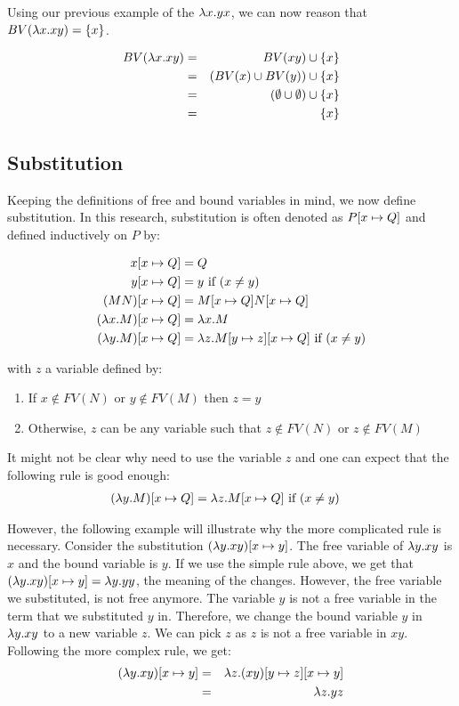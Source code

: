 Using our previous example of the \lterm $\lambda {x}.{yx}$, we can now reason that $BV(\lambda {x}.{xy}) = \{x\}$. 

\begin{eqnarray*}
	BV(\lambda {x}.{xy}) &=& BV(xy) \cup \{x\} \\
	&=& (BV(x) \cup BV(y)) \cup \{x\} \\
	&=& (\emptyset \cup \emptyset) \cup \{x\} \\
	&=& \{x\}
\end{eqnarray*}

\subsection{Substitution}
Keeping the definitions of free and bound variables in mind, we now define substitution. 
In this research, substitution is often denoted as $P [{x}\mapsto{Q}]$ and defined inductively on $P$ by:

\begin{align*}
	x [{x}\mapsto{Q}]             &= Q \\
	y [{x}\mapsto{Q}]             &= y \text{ if } (x \neq y)\\
	(M N) [{x}\mapsto{Q}]         &= M [{x}\mapsto{Q}] N [{x}\mapsto{Q}] \\
	(\lambda {x}.{M}) [{x}\mapsto{Q}] &= \lambda {x}.{M} \\
	(\lambda {y}.{M}) [{x}\mapsto{Q}] &= \lambda {z}.{M [{y}\mapsto{z}][{x}\mapsto{Q}]} \text{ if } (x \neq y) \\
\end{align*}

with $z$ a variable defined by:
\begin{enumerate}
	\item%
	If $x \notin FV(N)$ or $y \notin FV(M)$ then $z = y$
	\item%
	Otherwise, $z$ can be any variable such that $z \notin FV(N)$ or $z \notin FV(M)$
\end{enumerate}

It might not be clear why need to use the variable $z$ and one can expect that the following rule is good enough:
\begin{align*}
	(\lambda {y}.{M}) [{x}\mapsto{Q}] &= \lambda {z}.{M [{x}\mapsto{Q}]} \text{ if } (x \neq y)
\end{align*}

However, the following example will illustrate why the more complicated rule is necessary.
Consider the substitution $(\lambda {y}.{xy})[{x}\mapsto{y}]$. The free variable of \lterm $\lambda {y}.{xy}$ is $x$ and the bound variable is $y$.
If we use the simple rule above, we get that $(\lambda {y}.{xy})[{x}\mapsto{y}] = \lambda {y}.{yy}$, the meaning of the \lterm changes. 
However, the free variable we substituted, is not free anymore. The variable $y$ is not a free variable in the term that we substituted $y$ in.
Therefore, we change the bound variable $y$ in $\lambda {y}.{xy}$ to a new variable $z$. We can pick $z$ as $z$ is not a free variable in $xy$.
Following the more complex rule, we get: 
\begin{eqnarray*}
	(\lambda {y}.{xy})[{x}\mapsto{y}] &=& \lambda {z}.{(xy)[{y}\mapsto{z}][{x}\mapsto{y}]} \\
	&=& \lambda {z}.{yz}
\end{eqnarray*}


